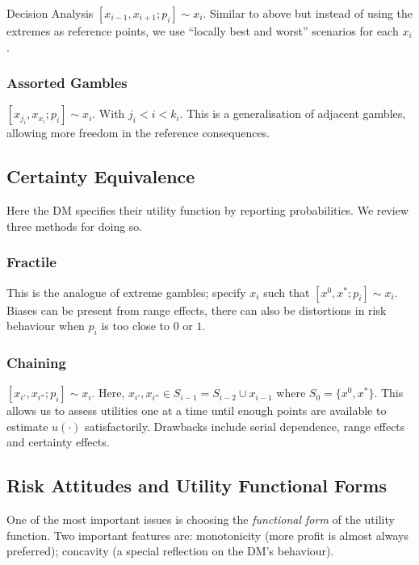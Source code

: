 \begin{chapter}{Decision Analysis \label{Ch:decision}}
$[x_{i-1}, x_{i+1}; p_i] \sim x_i$. Similar to above but instead of using the extremes as reference points, we use ``locally best and worst'' scenarios for each $x_i$.


\subsubsection*{Assorted Gambles}

$[x_{j_i}, x_{x_i}; p_i] \sim x_i$. With $j_i < i < k_i$. This is a generalisation of adjacent gambles, allowing more freedom in the reference consequences.

\subsection*{Certainty Equivalence}

Here the DM specifies their utility function by reporting probabilities. We review three methods for doing so.

\subsubsection*{Fractile}

This is the analogue of extreme gambles; specify $x_i$ such that $[x^0, x^*;p_i]\sim x_i$. Biases can be present from range effects, there can also be distortions in risk behaviour when $p_i$ is too close to $0$ or $1$.

\subsubsection*{Chaining}

$[x_{i'}, x_{i''}; p_i] \sim x_i$. Here, $x_{i'}, x_{i''} \in S_{i-1} = S_{i-2}\cup x_{i-1}$ where $S_0  =\{x^0, x^*\}$. This allows us to assess utilities one at a time until enough points are available to estimate $u(\cdot)$ satisfactorily. Drawbacks include serial dependence, range effects and certainty effects.



\subsection{Risk Attitudes and Utility Functional Forms}

One of the most important issues is choosing the \textit{functional form} of the utility function. Two important features are: monotonicity (more profit is almost always preferred); concavity (a special reflection on the DM's behaviour).


\end{chapter}
